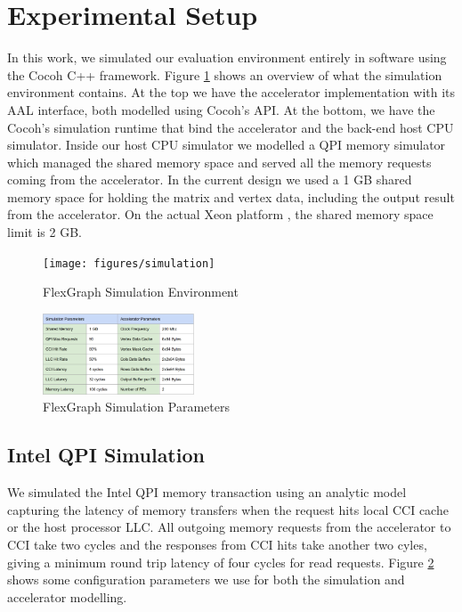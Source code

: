 \section{Experimental Setup}

In this work, we simulated our evaluation environment entirely in software using the Cocoh \cite{Cocoh} C++ framework. Figure \ref{fig:simulation} shows an overview of what the simulation environment contains. At the top we have the accelerator implementation with its AAL interface, both modelled using Cocoh's API. At the bottom, we have the Cocoh's simulation runtime that bind the accelerator and the back-end host CPU simulator. Inside our host CPU simulator we modelled a QPI memory simulator which managed the shared memory space and served all the memory requests coming from the accelerator. In the current design we used a 1 GB shared memory space for holding the matrix and vertex data, including the output result from the accelerator. On the actual Xeon platform \cite{Intel-FPGA}, the shared memory space limit is 2 GB.

\begin{figure}[htbp]
\centering
\texttt{[image: figures/simulation]}
\caption{FlexGraph Simulation Environment}
\label{fig:simulation}
\end{figure}

\begin{figure}[htbp]
\centering
\includegraphics[width=0.4\textwidth]{figures/simulation_parameters}
\caption{FlexGraph Simulation Parameters}
\label{fig:simulation_parameters}
\end{figure}

\subsection{Intel QPI Simulation}
We simulated the Intel QPI memory transaction using an analytic model capturing the latency of memory transfers when the request hits local CCI \cite{CCI} cache or the host processor LLC. All outgoing memory requests from the accelerator to CCI take two cycles and the responses from CCI hits take another two cyles, giving a minimum round trip latency of four cycles for read requests. Figure \ref{fig:simulation_parameters} shows some configuration parameters we use for both the simulation and accelerator modelling.     

